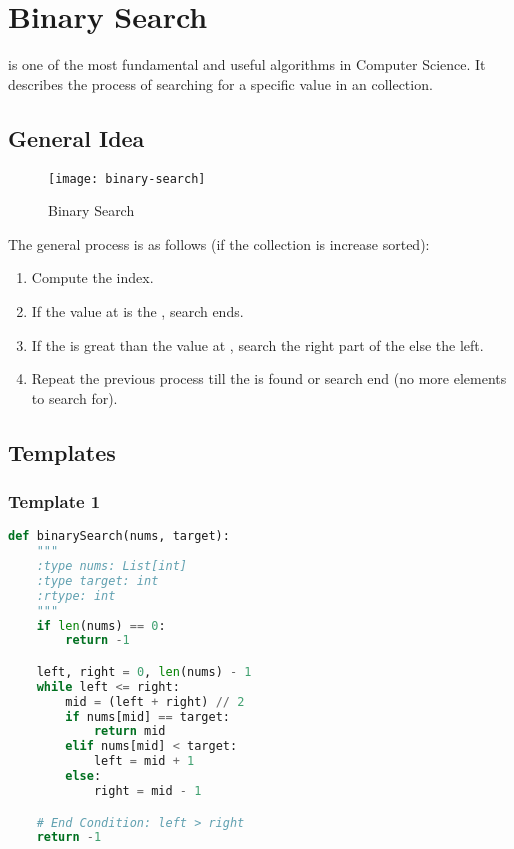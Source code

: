 
\chapter{Binary Search}
\label{cha:binary-search}

 is one of the most fundamental and useful algorithms in Computer Science.
It describes the process of searching for a specific value in an  collection.


\section{General Idea}
\label{sec:general-idea}

\begin{figure}[H]
  \centering
  \texttt{[image: binary-search]}
  \caption{Binary Search}
  \label{fig:binary-search}
\end{figure}

The general process is as follows (if the collection is increase sorted):
\begin{enumerate}
\item Compute the  index.
\item If the value at  is the , search ends.
\item If the  is great than the value at , search the right part of the  else the left.
\item Repeat the previous process till the  is found or search end (no more elements to search for).
\end{enumerate}

\section{Templates}
\label{sec:templates}

\subsection{Template 1}
\label{sec:template-1}

\begin{lstlisting}[language=python]
def binarySearch(nums, target):
    """
    :type nums: List[int]
    :type target: int
    :rtype: int
    """
    if len(nums) == 0:
        return -1

    left, right = 0, len(nums) - 1
    while left <= right:
        mid = (left + right) // 2
        if nums[mid] == target:
            return mid
        elif nums[mid] < target:
            left = mid + 1
        else:
            right = mid - 1

    # End Condition: left > right
    return -1
\end{lstlisting}

